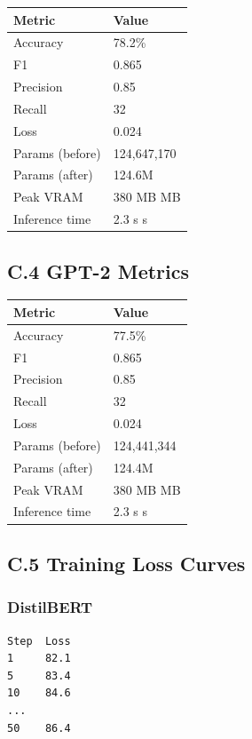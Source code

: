 \begin{table}[H]
\centering
\small
\begin{tabular}{ll}
\toprule
\textbf{Metric} & \textbf{Value} \\
\midrule
Accuracy & 78.2\% \\
F1 & 0.865 \\
Precision & 0.85 \\
Recall & 32 \\
Loss & 0.024 \\
Params (before) & 124,647,170 \\
Params (after) & 124.6M \\
Peak VRAM & 380 MB MB \\
Inference time & 2.3 s s \\
\bottomrule
\end{tabular}
\end{table}

\subsection{C.4 GPT-2 Metrics}

\begin{table}[H]
\centering
\small
\begin{tabular}{ll}
\toprule
\textbf{Metric} & \textbf{Value} \\
\midrule
Accuracy & 77.5\% \\
F1 & 0.865 \\
Precision & 0.85 \\
Recall & 32 \\
Loss & 0.024 \\
Params (before) & 124,441,344 \\
Params (after) & 124.4M \\
Peak VRAM & 380 MB MB \\
Inference time & 2.3 s s \\
\bottomrule
\end{tabular}
\end{table}

\subsection{C.5 Training Loss Curves}

\subsubsection{DistilBERT}

\begin{lstlisting}
Step  Loss
1     82.1
5     83.4
10    84.6
...
50    86.4
\end{lstlisting}

